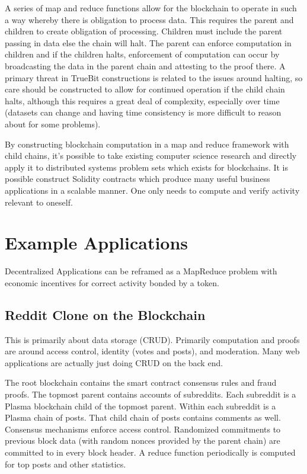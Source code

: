 \documentclass[letterpaper, 11pt]{article}
\begin{document}
A series of map and reduce functions allow for the blockchain to operate in such
a way whereby there is obligation to process data. This requires the parent and
children to create obligation of processing. Children must include the parent
passing in data else the chain will halt. The parent can enforce computation in
children and if the children halts, enforcement of computation can occur by
broadcasting the data in the parent chain and attesting to the proof there. A
primary threat in TrueBit constructions is related to the issues around halting,
so care should be constructed to allow for continued operation if the child
chain halts, although this requires a great deal of complexity, especially over
time (datasets can change and having time consistency is more difficult to
reason about for some problems).

By constructing blockchain computation in a map and reduce framework with child
chains, it's possible to take existing computer science research and directly
apply it to distributed systems problem sets which exists for blockchains. It is
possible construct Solidity contracts which produce many useful business
applications in a scalable manner. One only needs to compute and verify activity
relevant to oneself.

\section{Example Applications}

Decentralized Applications can be reframed as a MapReduce problem with economic
incentives for correct activity bonded by a token.

\subsection{Reddit Clone on the Blockchain}

This is primarily about data storage (CRUD). Primarily computation and proofs
are around access control, identity (votes and posts), and moderation. Many web
applications are actually just doing CRUD on the back end.

The root blockchain contains the smart contract consensus rules and fraud
proofs. The topmost parent contains accounts of subreddits. Each subreddit is a
Plasma blockchain child of the topmost parent. Within each subreddit is a Plasma
chain of posts. That child chain of posts contains comments as well. Consensus
mechanisms enforce access control. Randomized commitments to previous block data
(with random nonces provided by the parent chain) are committed to in every
block header. A reduce function periodically is computed for top posts and other
statistics.
\end{document}
